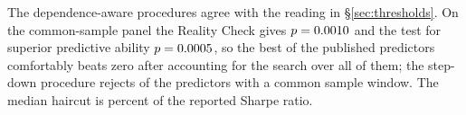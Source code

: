 \documentclass{article}
\begin{document}
The dependence-aware procedures agree with the reading in
\S\ref{sec:thresholds}. On the common-sample panel the Reality Check gives
$p = 0.0010$ and the test for superior predictive ability
$p = 0.0005$, so the best of the published predictors comfortably beats zero
after accounting for the search over all of them; the \citet{romano2005}
step-down procedure rejects \bzooromanoWolfReject{} of the
\bzooromanoWolfN{} predictors with a common sample window. The median
\citet{harvey2015backtesting} haircut is \bzoohaircutMedianPct{} percent of the
reported Sharpe ratio.



\end{document}
